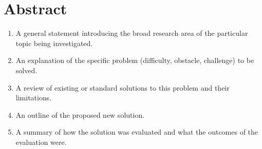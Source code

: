 \chapter{Abstract}

\begin{enumerate}
    \item A general statement introducing the broad research area of
          the particular topic being investigated.
    \item An explanation of the specific problem (difficulty, obstacle,
          challenge) to be solved.
    \item A review of existing or standard solutions to this problem and
          their limitations.
    \item An outline of the proposed new solution.
    \item A summary of how the solution was evaluated and what the
          outcomes of the evaluation were.
\end{enumerate}
